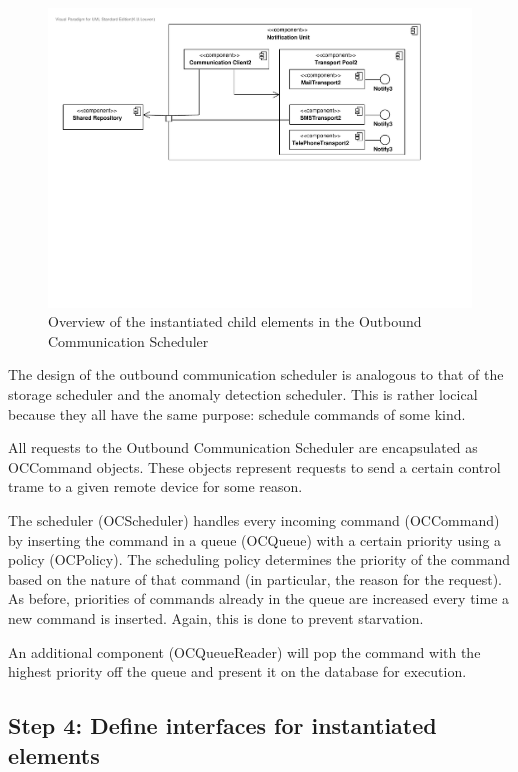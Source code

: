 \begin{figure}[H]
	\begin{centering}
		\includegraphics[width=\textwidth]{figs/add-it7-elements.pdf}
		\caption{Overview of the instantiated child elements in the Outbound
		Communication Scheduler}
		\label{fig:it7/elements}
	\end{centering}
\end{figure}

\npar The design of the outbound communication scheduler is analogous to that
of the storage scheduler and the anomaly detection scheduler. This is rather
locical because they all have the same purpose: schedule commands of some kind.

\npar All requests to the Outbound Communication Scheduler are encapsulated as
OCCommand objects. These objects represent requests to send a certain control
trame to a given remote device for some reason. 

\npar The scheduler (OCScheduler) handles every incoming command
(OCCommand) by inserting the command in a queue (OCQueue) with a
certain priority using a policy (OCPolicy). The scheduling policy
determines the priority of the command based on the nature of that command
(in particular, the reason for the request). As before, priorities of commands
already in the queue are increased every time a new command is inserted.
Again, this is done to prevent starvation.

\npar An additional component (OCQueueReader) will pop the command with the
highest priority off the queue and present it on the database for execution.

\subsection{Step 4: Define interfaces for instantiated elements}
\label{add:it7/interfaces}

